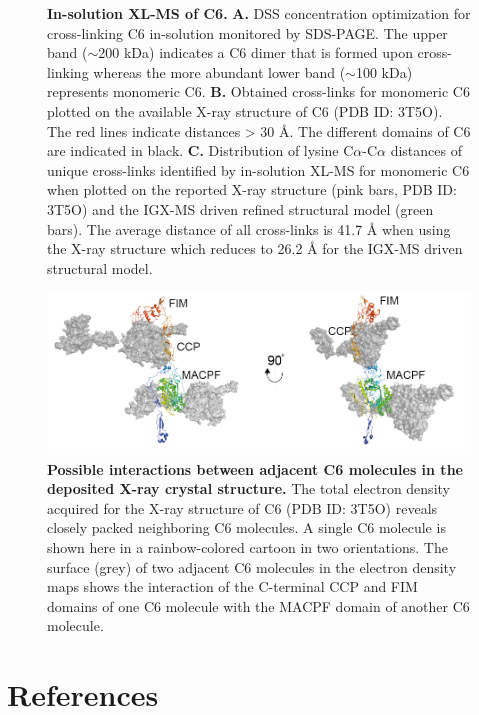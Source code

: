 \begin{subappendices}
\begin{figure}[hbt]
        \caption{\textbf{In-solution XL-MS of C6.} \textbf{A.} DSS concentration optimization for cross-linking C6 in-solution monitored by SDS-PAGE. The upper band ($\sim$200 kDa) indicates a C6 dimer that is formed upon cross-linking whereas the more abundant lower band ($\sim$100 kDa) represents monomeric C6. \textbf{B.} Obtained cross-links for monomeric C6 plotted on the available X-ray structure of C6 (PDB ID: 3T5O). The red lines indicate distances > 30 Å. The different domains of C6 are indicated in black. \textbf{C.} Distribution of lysine C$\alpha$-C$\alpha$ distances of unique cross-links identified by in-solution XL-MS for monomeric C6 when plotted on the reported X-ray structure (pink bars, PDB ID: 3T5O) and the IGX-MS driven refined structural model (green bars). The average distance of all cross-links is 41.7 Å when using the X-ray structure which reduces to 26.2 Å for the IGX-MS driven structural model.}
        \label{fig:ch2_app_fig9}
    \end{figure}
    \begin{figure}[hbt]
        \center
        \includegraphics[]{Chapter.2/Figures/SI_Figure7.png}
        \caption{\textbf{Possible interactions between adjacent C6 molecules in the deposited X-ray crystal structure.} The total electron density acquired for the X-ray structure of C6 (PDB ID: 3T5O) reveals closely packed neighboring C6 molecules. A single C6 molecule is shown here in a rainbow-colored cartoon in two orientations. The surface (grey) of two adjacent C6 molecules in the electron density maps shows the interaction of the C-terminal CCP and FIM domains of one C6 molecule with the MACPF domain of another C6 molecule.}
        \label{fig:ch2_app_fig10}
    \end{figure}
\end{subappendices}
%
\clearpage
\section*{References}


\stopthumb